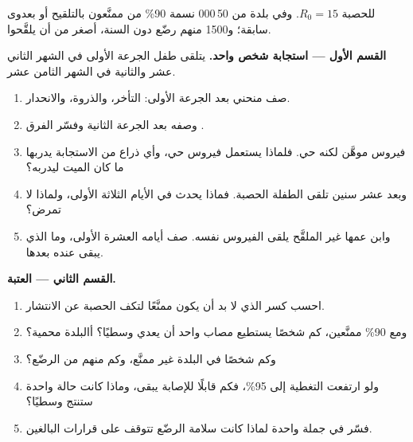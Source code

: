 \begin{problem}
\label{pb:g12:adaptive-immunity:1}
للحصبة $R_0 = 15$. وفي بلدة من 50\,000 نسمة 90\% من  ممنَّعون
بالتلقيح أو بعدوى سابقة؛ و1500 منهم رضّع دون السنة، أصغر من أن
يلقَّحوا.

\medskip
\noindent\textbf{القسم الأول --- استجابة شخص واحد.}
يتلقى طفل الجرعة الأولى في الشهر الثاني عشر والثانية في الشهر الثامن عشر.
\begin{enumerate}
  \item صف منحني  بعد الجرعة الأولى: التأخر، والذروة،
        والانحدار.
  \item وصفه بعد الجرعة الثانية وفسّر الفرق .
  \item فيروس  موهَّن لكنه حي. فلماذا يستعمل فيروس حي، وأي ذراع
        من الاستجابة يدربها ما كان الميت ليدربه؟
  \item وبعد عشر سنين تلقى الطفلة الحصبة. فماذا يحدث في الأيام الثلاثة
        الأولى، ولماذا لا تمرض؟
  \item وابن عمها غير الملقَّح يلقى الفيروس نفسه. صف أيامه العشرة
        الأولى، وما الذي يبقى عنده بعدها.
\end{enumerate}

\medskip
\noindent\textbf{القسم الثاني --- العتبة.}
\begin{enumerate}[resume]
  \item احسب كسر  الذي لا بد أن يكون ممنَّعًا لتكف الحصبة عن
        الانتشار.
  \item ومع 90\% ممنَّعين، كم شخصًا يستطيع مصاب واحد أن يعدي وسطيًا؟
        أالبلدة محمية؟
  \item وكم شخصًا في البلدة غير ممنَّع، وكم منهم من الرضّع؟
  \item ولو ارتفعت التغطية إلى 95\%، فكم قابلًا للإصابة يبقى، وماذا
        كانت حالة واحدة ستنتج وسطيًا؟
  \item فسّر في جملة واحدة لماذا كانت سلامة الرضّع تتوقف على قرارات
        البالغين.
\end{enumerate}


\end{problem}
